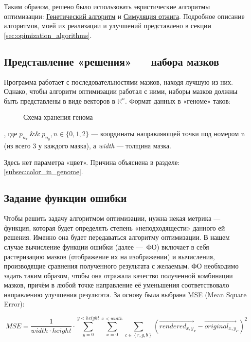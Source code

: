 Таким образом, решено было использовать эвристические алгоритмы оптимизации:
\href{https://en.wikipedia.org/wiki/Simulated_annealing}{Генетический алгоритм} и \href{https://en.wikipedia.org/wiki/Simulated_annealing}{Симуляция отжига}.
Подробное описание алгоритмов, моей их реализации и улучшений представлено в секции \ref{sec:opimization_algorithms}.

\subsection{Представление «решения»  — набора мазков}
Программа работает с последовательностями мазков, находя лучшую из них.
Однако, чтобы алгоритм оптимизации работал с ними, наборы мазков должны быть представлены в виде векторов в $\mathbb{R}^n$.
Формат данных в «геноме» таков:

\begin{figure}[h]
    \centering
    \caption{Схема хранения генома}
    \label{fig:genome_contents_table}
\end{figure}


, где $p_{n_x} ~\&\&~ p_{n_y}, n \in \{ 0, 1, 2 \}$ — координаты направляющей точки под номером n (из всего 3 у каждого мазка),
а \textit{width}  — толщина мазка.

Здесь нет параметра  «цвет».
Причина объяснена в разделе: \ref{subsec:color_in_genome}.

\subsection{Задание функции ошибки}
Чтобы решить задачу алгоритмом оптимизации, нужна некая метрика — функция, которая будет определять степень «неподходящести» данного ей решения.
Именно она будет передаваться алгоритму оптимизации.
В нашем случае вычисление функции ошибки (далее — ФО) включает в себя растеризацию мазков (отображение их на изображении) и вычисления, производящие сравнения полученного результата с желаемым.
ФО необходимо задать таким образом, чтобы она отражала качество полученной комбинации мазков,
причём в любой точке направление её уменьшения соответствовало направлению улучшения результата.
За основу была выбрана \href{https://en.wikipedia.org/wiki/Mean_squared_error}{MSE} (Mean Square Error):

\begin{equation}\label{eq:equation}
    MSE = \frac{1}{width \cdot height} \cdot \sum_{y = 0}^{y < height} { \sum_{x = 0}^{x < width} { \sum_{c \in  \left\{ r, g, b \right\} } { \left( {\overrightarrow {rendered_{x, y}}}_c - {\overrightarrow{original_{x, y}}}_c\right)^2 }}}
\end{equation}

